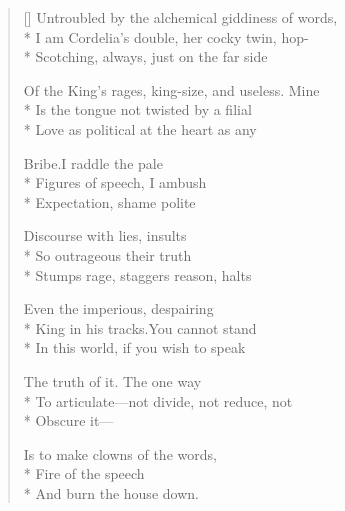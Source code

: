 \label{ch:lear_aj}
\begin{verse}[\versewidth]
 Untroubled by the alchemical giddiness of words,\\*
I am Cordelia's double, her cocky twin, hop-\\*
Scotching, always, just on the far side

Of the King's rages, king-size, and useless.   Mine\\*
Is the tongue not twisted by a filial\\*
Love as political at the heart as any

Bribe.\qquad I raddle the pale\\*
Figures of speech, I ambush\\*
Expectation, shame polite

Discourse with lies, insults\\*
So outrageous their truth\\*
Stumps rage, staggers reason, halts

Even the imperious, despairing\\*
King in his tracks.\qquad You cannot stand\\*
In this world, if you wish to speak

The truth of it.  The one way\\*
To articulate---not divide, not reduce, not\\*
Obscure it---

 Is to make clowns of the words,\\*
Fire of the speech\\*
And burn the house down.
\end{verse}
